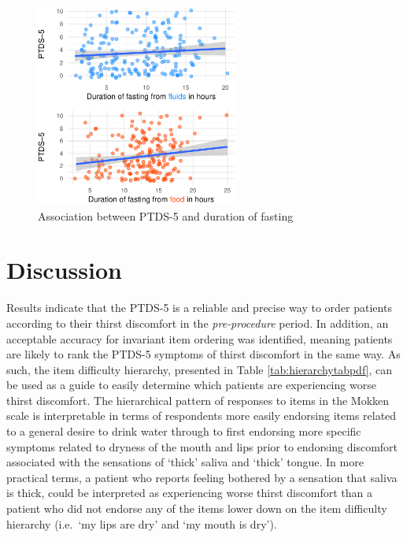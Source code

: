 \documentclass[12pt,twocolumn,twoside,]{pinp}
\begin{document}
\begin{figure}

{\centering \includegraphics[width=252px]{manuscript_files/figure-latex/fasting-1} 

}

\caption{Association between PTDS-5 and duration of fasting}\label{fig:fasting}
\end{figure}

\hypertarget{discussion}{%
\section{Discussion}\label{discussion}}

Results indicate that the PTDS-5 is a reliable and precise way to order
patients according to their thirst discomfort in the
\emph{pre-procedure} period. In addition, an acceptable accuracy for
invariant item ordering was identified, meaning patients are likely to
rank the PTDS-5 symptoms of thirst discomfort in the same way. As such,
the item difficulty hierarchy, presented in Table
\ref{tab:hierarchytabpdf}, can be used as a guide to easily determine
which patients are experiencing worse thirst discomfort. The
hierarchical pattern of responses to items in the Mokken scale is
interpretable in terms of respondents more easily endorsing items
related to a general desire to drink water through to first endorsing
more specific symptoms related to dryness of the mouth and lips prior to
endorsing discomfort associated with the sensations of `thick' saliva
and `thick' tongue. In more practical terms, a patient who reports
feeling bothered by a sensation that saliva is thick, could be
interpreted as experiencing worse thirst discomfort than a patient who
did not endorse any of the items lower down on the item difficulty
hierarchy (i.e.~`my lips are dry' and `my mouth is dry').
\end{document}
